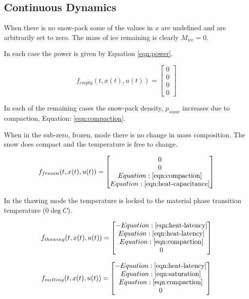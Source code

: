 \documentclass{article}
\begin{document}
\subsection{Continuous Dynamics}

When there is no snow-pack some of the values in $x$ are undefined 
and are arbitrarily set to zero.
The mass of ice remaining is clearly $M_{ice} = 0$.

In each case the power is given by Equation \ref{eqn:power}.

\begin{equation}
f_{empty}(t,x(t),u(t)) = 
  \begin{bmatrix} 0 \\ 0 \\ 0 \\ 0 \end{bmatrix}
\end{equation}

In each of the remaining cases the snow-pack density, $p_{snow}$
increases due to compaction, Equation: \ref{eqn:compaction}.

When in the sub-zero, frozen, mode  there is no change in mass composition.
The snow does compact and the temperature is free to change.

\begin{equation}
f_{frozen}(t,x(t),u(t)) = 
  \begin{bmatrix} 
     0 \\ 0 \\ 
     Equation: \ref{eqn:compaction} \\ 
     Equation: \ref{eqn:heat-capacitance} 
  \end{bmatrix}
\end{equation}

In the thawing mode the temperature is locked to the material
phase transition temperature ($0 \deg C$).

\begin{equation}
f_{thawing}(t,x(t),u(t)) = 
  \begin{bmatrix} 
     - Equation: \ref{eqn:heat-latency} \\ 
     Equation: \ref{eqn:heat-latency} \\ 
     Equation: \ref{eqn:compaction} \\ 
     0 
  \end{bmatrix}
\end{equation}

\begin{equation}
f_{melting}(t,x(t),u(t)) = 
  \begin{bmatrix} 
     - Equation: \ref{eqn:heat-latency} \\ 
     Equation: \ref{eqn:saturation} \\ 
     Equation: \ref{eqn:compaction} \\ 
     0 
  \end{bmatrix}
\end{equation}
\end{document}
